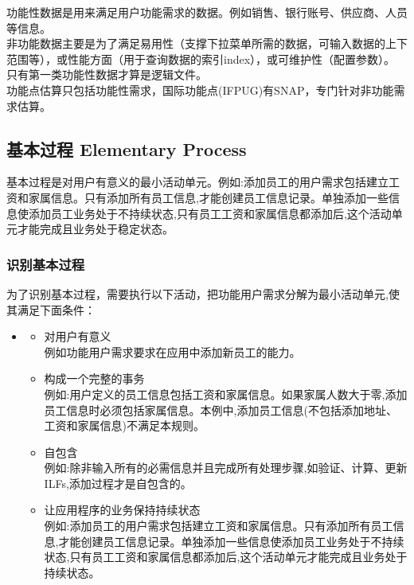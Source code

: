 功能性数据是用来满足用户功能需求的数据。例如销售、银行账号、供应商、人员等信息。\\
非功能数据主要是为了满足易用性（支撑下拉菜单所需的数据，可输入数据的上下范围等），或性能方面（用于查询数据的索引index），或可维护性（配置参数）。\\
只有第一类功能性数据才算是逻辑文件。\\
功能点估算只包括功能性需求，国际功能点(IFPUG)有SNAP，专门针对非功能需求估算。

\hypertarget{ux57faux672cux8fc7ux7a0b-elementary-process}{%
\subsection{基本过程 Elementary
Process}\label{ux57faux672cux8fc7ux7a0b-elementary-process}}

基本过程是对用户有意义的最小活动单元。例如:添加员工的用户需求包括建立工资和家属信息。只有添加所有员工信息,才能创建员工信息记录。单独添加一些信息使添加员工业务处于不持续状态,只有员工工资和家属信息都添加后,这个活动单元才能完成且业务处于稳定状态。

\hypertarget{ux8bc6ux522bux57faux672cux8fc7ux7a0b}{%
\subsubsection{识别基本过程}\label{ux8bc6ux522bux57faux672cux8fc7ux7a0b}}

为了识别基本过程，需要执行以下活动，把功能用户需求分解为最小活动单元,使其满足下面条件：

\begin{itemize}
\item
  \begin{itemize}
  \tightlist
  \item
    对用户有意义\\
    例如功能用户需求要求在应用中添加新员工的能力。\\
  \item
    构成一个完整的事务\\
    例如:用户定义的员工信息包括工资和家属信息。如果家属人数大于零,添加员工信息时必须包括家属信息。本例中,添加员工信息(不包括添加地址、工资和家属信息)不满足本规则。\\
  \item
    自包含\\
    例如:除非输入所有的必需信息并且完成所有处理步骤,如验证、计算、更新ILFs,添加过程才是自包含的。\\
  \item
    让应用程序的业务保持持续状态\\
    例如:添加员工的用户需求包括建立工资和家属信息。只有添加所有员工信息,才能创建员工信息记录。单独添加一些信息使添加员工业务处于不持续状态,只有员工工资和家属信息都添加后,这个活动单元才能完成且业务处于持续状态。\\
  \end{itemize}
\end{itemize}


